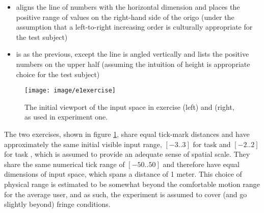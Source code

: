 \begin{itemize}
	\item {} aligns the line of numbers with the  horizontal dimension and places the positive range of values on the right-hand side of the origo (under the assumption  that a left-to-right increasing order is culturally appropriate for the test subject)\\
	\item {} is as the previous, except the line is angled vertically and lists the positive numbers on the upper half (assuming the intuition of height is appropriate choice for the test subject)   
\end{itemize}


\begin{figure}
	\centering
	\texttt{[image: image/e1exercise]}
	\caption{The initial viewport of the input space in exercise  (left) and  (right, as used in experiment one.}
	\label{fig:expOneExecises}
\end{figure}







The two exercises, shown in figure \ref{fig:expOneExecises}, share equal tick-mark distances and have approximately the same initial visible input range, $[-3..3]$ for task  and  $[-2..2]$ for task , which is assumed to provide an adequate sense of spatial scale. They share the same numerical tick range of $[-50..50]$ and therefore have equal dimensions of input space, which spans a  distance of 1 meter. This choice of physical range is estimated to be somewhat beyond the comfortable motion range for the average user, and as such, the experiment is assumed to cover (and go slightly beyond) fringe conditions.

